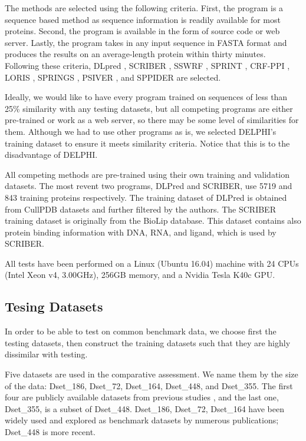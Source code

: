 The methods are selected using the following criteria. First, the program is a sequence based method as sequence information is readily available for most proteins. Second, the program is available in the form of source code or web server. Lastly, the program takes in any input sequence in FASTA format and produces the results on an average-length protein within thirty minutes. Following these criteria, DLpred \cite{zhang2019sequence}, SCRIBER \cite{zhang2019scriber}, SSWRF \cite{wei2016protein}, SPRINT \cite{taherzadeh2016sequence}, CRF-PPI \cite{wei2015cascade}, LORIS \cite{dhole2014sequence}, SPRINGS \cite{singh2014springs}, PSIVER \cite{murakami2010applying}, and SPPIDER \cite{porollo2007prediction} are selected.

Ideally, we would like to have every program trained on sequences of less than 25\% similarity with any testing datasets, but all competing programs are either pre-trained or work as a web server, so there may be some level of similarities for them. Although we had to use other programs as is, we selected DELPHI's training dataset to ensure it meets similarity criteria. Notice that this is to the disadvantage of DELPHI.

All competing methods are pre-trained using their own training and validation datasets. The most revent two programs, DLPred and SCRIBER, use 5719 and 843 training proteins respectively. The training dataset of DLPred is obtained from CullPDB datasets \cite{wang2003pisces} and further filtered by the authors. The SCRIBER training dataset is originally from the BioLip database. This dataset contains also protein binding information with DNA, RNA, and ligand, which is used by SCRIBER.

All tests have been performed on a Linux (Ubuntu 16.04) machine with 24 CPUs (Intel Xeon v4, 3.00GHz), 256GB memory, and a Nvidia Tesla K40c GPU.
\subsection{Tesing Datasets \label{testing_data}}
In order to be able to test on common benchmark data, we choose first the testing datasets, then construct the training datasets such that they are highly dissimilar with testing.

Five datasets are used in the comparative assessment. We name them by the size of the data: Dset\_186, Dset\_72, Dset\_164, Dset\_448, and Dset\_355. The first four are publicly available datasets from previous studies \cite{murakami2010applying} \cite{dhole2014sequence} \cite{zhang2019scriber}, and the last one, Dset\_355, is a subset of Dset\_448. Dset\_186, Dset\_72, Dset\_164 have been widely used and explored as benchmark datasets by numerous publications; Dset\_448 is more recent.

